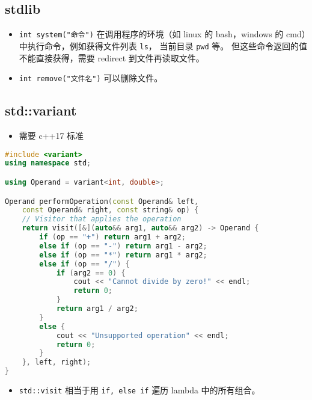 \subsection{stdlib}
\begin{itemize}
\item \verb`int system("命令")` 在调用程序的环境（如 linux 的 bash，windows 的 cmd）中执行命令，例如获得文件列表 \verb`ls`， 当前目录 \verb`pwd` 等。 但这些命令返回的值不能直接获得，需要 redirect 到文件再读取文件。
\item \verb`int remove("文件名")` 可以删除文件。
\end{itemize}

\subsection{std::variant}
\begin{itemize}
\item 需要 c++17 标准
\end{itemize}
\begin{lstlisting}[language=cpp]
#include <variant>
using namespace std;

using Operand = variant<int, double>;

Operand performOperation(const Operand& left,
    const Operand& right, const string& op) {
    // Visitor that applies the operation
    return visit([&](auto&& arg1, auto&& arg2) -> Operand {
        if (op == "+") return arg1 + arg2;
        else if (op == "-") return arg1 - arg2;
        else if (op == "*") return arg1 * arg2;
        else if (op == "/") {
            if (arg2 == 0) {
                cout << "Cannot divide by zero!" << endl;
                return 0;
            }
            return arg1 / arg2;
        }
        else {
            cout << "Unsupported operation" << endl;
            return 0;
        }
    }, left, right);
}
\end{lstlisting}
\begin{itemize}
\item \verb|std::visit| 相当于用 \verb|if, else if| 遍历 lambda 中的所有组合。
\end{itemize}
